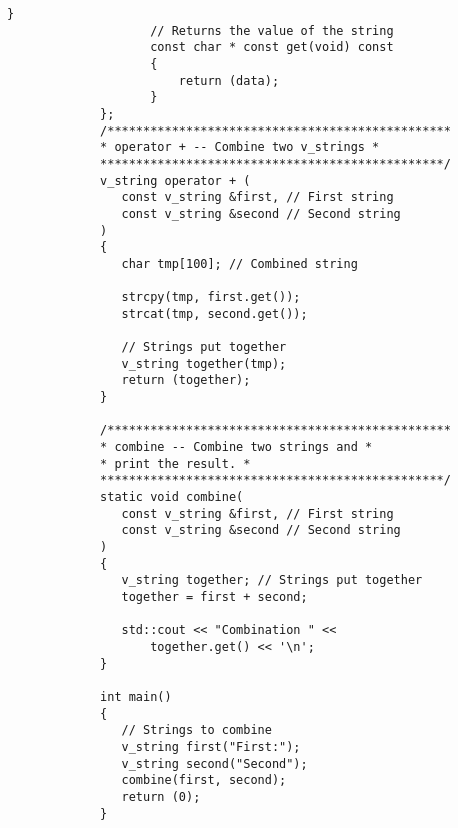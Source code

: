 \begin{LTR}
\begin{lstlisting}[style=C++Style]
             		}
             		// Returns the value of the string
             		const char * const get(void) const
             		{
             			return (data);
             		}
             };
             /************************************************
             * operator + -- Combine two v_strings *
             ************************************************/
             v_string operator + (
             	const v_string &first, // First string
             	const v_string &second // Second string
             )
             {
             	char tmp[100]; // Combined string

             	strcpy(tmp, first.get());
             	strcat(tmp, second.get());

             	// Strings put together
             	v_string together(tmp);
             	return (together);
             }

             /************************************************
             * combine -- Combine two strings and *
             * print the result. *
             ************************************************/
             static void combine(
             	const v_string &first, // First string
             	const v_string &second // Second string
             )
             {
             	v_string together; // Strings put together
             	together = first + second;

             	std::cout << "Combination " <<
             		together.get() << '\n';
             }

             int main()
             {
             	// Strings to combine
             	v_string first("First:");
             	v_string second("Second");
             	combine(first, second);
             	return (0);
             }
        \end{lstlisting}
\end{LTR}
